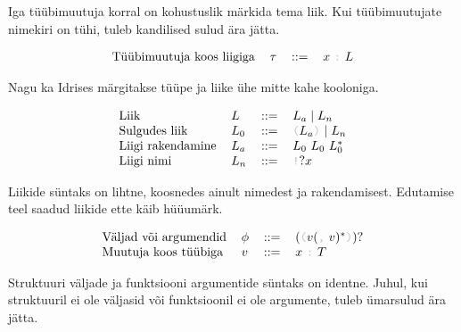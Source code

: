 \documentclass[12pt]{article}
\begin{document}
      Iga tüübimuutuja korral on kohustuslik märkida tema liik. Kui tüübimuutujate nimekiri on tühi, tuleb kandilised sulud ära jätta.

      \begin{equation*}
        \begin{tabular}{llll}
          Tüübimuutuja koos liigiga & $\tau$ & $::=$ & $x$ {\color{helehall}\verb!:!} $L$
        \end{tabular}
      \end{equation*}

      Nagu ka Idrises märgitakse tüüpe ja liike ühe mitte kahe kooloniga.

      \begin{equation*}
        \begin{tabular}{llll}
          Liik              & $L$   & $::=$ & $L_a\mid L_n$                                                        \\
          Sulgudes liik     & $L_0$ & $::=$ & {\color{helehall}\verb!(!}$L_a${\color{helehall}\verb!)!} $\mid L_n$ \\
          Liigi rakendamine & $L_a$ & $::=$ & $L_0$ $L_0$ $L_0^*$                                                  \\
          Liigi nimi        & $L_n$ & $::=$ & {\color{helehall}\verb"!"}$?x$
        \end{tabular}
      \end{equation*}

      Liikide süntaks on lihtne, koosnedes ainult nimedest ja rakendamisest. Edutamise teel saadud liikide ette käib hüüumärk.

      \begin{equation*}
        \begin{tabular}{llll}
          Väljad või argumendid & $\phi$ & $::=$ & $(${\color{helehall}\verb!(!}$v(${\color{helehall}\verb!,!} $v)^*${\color{helehall}\verb!)!}$)?$ \\
          Muutuja koos tüübiga  & $v$    & $::=$ & $x$ {\color{helehall}\verb!:!} $T$
        \end{tabular}
      \end{equation*}

      Struktuuri väljade ja funktsiooni argumentide süntaks on identne. Juhul, kui struktuuril ei ole väljasid või funktsioonil ei ole argumente, tuleb ümarsulud ära jätta.
\end{document}
